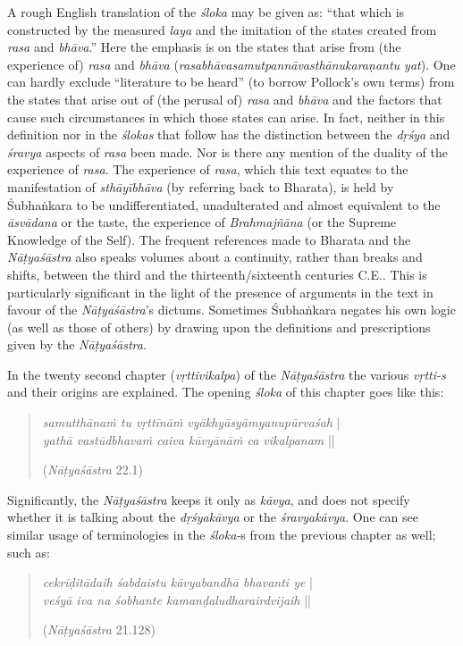 A rough English translation of the \textsl{śloka} may be given as: “that which is constructed by the measured \textsl{laya} and the imitation of the states created from \textsl{rasa} and \textsl{bhāva}.” Here the emphasis is on the states that arise from (the experience of) \textsl{rasa} and \textsl{bhāva} (\textsl{rasabhāvasamutpannāvasthānukaraṇantu yat}). One can hardly exclude “literature to be heard” (to borrow Pollock’s own terms) from the states that arise out of (the perusal of) \textsl{rasa} and \textsl{bhāva} and the factors that cause such circumstances in which those states can arise. In fact, neither in this definition nor in the \textsl{ślokas} that follow has the distinction between the \textsl{dṛśya} and \textsl{śravya} aspects of \textsl{rasa} been made. Nor is there any mention of the duality of the experience of \textsl{rasa}. The experience of \textsl{rasa}, which this text equates to the manifestation of \textsl{sthāyībhāva} (by referring back to Bharata), is held by Śubhaṅkara to be undifferentiated, unadulterated and almost equivalent to the \textsl{āsvādana} or the taste, the experience of \textsl{Brahmajñāna} (or the Supreme Knowledge of the Self). The frequent references made to Bharata and the \textsl{Nāṭyaśāstra} also speaks volumes about a continuity, rather than breaks and shifts, between the third and the thirteenth/sixteenth centuries C.E.. This is particularly significant in the light of the presence of arguments in the text in favour of the \textsl{Nāṭyaśāstra}’s dictums. Sometimes Śubhaṅkara negates his own logic (as well as those of others) by drawing upon the definitions and prescriptions given by the \textsl{Nāṭyaśāstra}.       

In the twenty second chapter (\textsl{vṛttivikalpa}) of the \textsl{Nāṭyaśāstra} the various \textsl{vṛtti-s} and their origins are explained. The opening \textsl{śloka} of this chapter goes like this:
\begin{quote}
\textsl{samutthānaṁ tu vṛttīnāṁ vyākhyāsyāmyanupūrvaśah} |  \\
\textsl{yathā vastūdbhavaṁ caiva kāvyānāṁ ca vikalpanam} ||

\hfill(\textsl{Nāṭyaśāstra} 22.1)
\end{quote}

Significantly, the \textsl{Nāṭyaśāstra} keeps it only as \textsl{kāvya}, and does not specify whether it is talking about the \textsl{dṛśyakāvya} or the \textsl{śravyakāvya}. One can see similar usage of terminologies in the \textsl{śloka-}s from the previous chapter as well; such as:
\begin{quote}
\textsl{cekrīḍitādaih śabdaistu kāvyabandhā bhavanti ye} |  \\
\textsl{veśyā iva na śobhante kamanḍaludharairdvijaih} ||

\hfill(\textsl{Nāṭyaśāstra} 21.128)
\end{quote}

